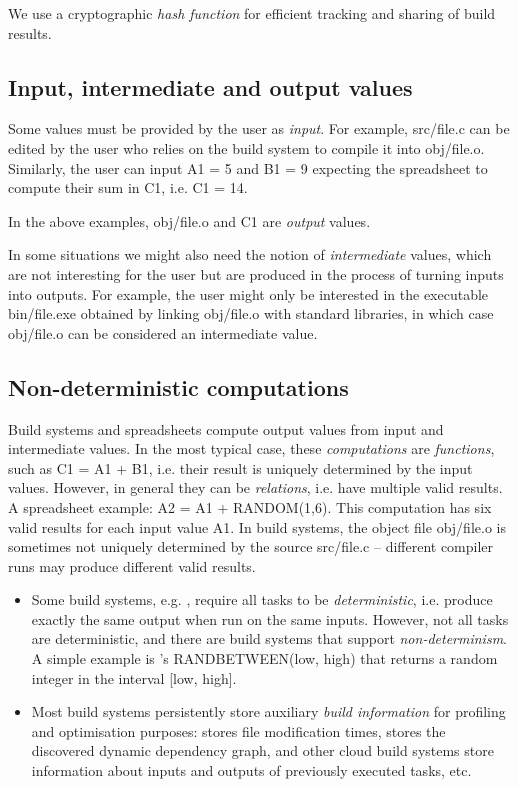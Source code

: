 We use a cryptographic \emph{hash function}  for
efficient tracking and sharing of build results.

\subsection{Input, intermediate and output values}

Some values must be provided by the user as \emph{input}. For example,
\textsf{src/file.c} can be edited by the user who relies on the build system to
compile it into \textsf{obj/file.o}. Similarly, the user can input \textsf{A1 = 5}
and \textsf{B1 = 9} expecting the spreadsheet to compute their sum in \textsf{C1},
i.e. \textsf{C1 = 14}.

In the above examples, \textsf{obj/file.o} and \textsf{C1} are \emph{output} values.

In some situations we might also need the notion of \emph{intermediate} values,
which are not interesting for the user but are produced in the process of turning
inputs into outputs. For example, the user might only be interested in the
executable \textsf{bin/file.exe} obtained by linking \textsf{obj/file.o} with
standard libraries, in which case \textsf{obj/file.o} can be considered an
intermediate value.

\subsection{Non-deterministic computations}

Build systems and spreadsheets compute output values from input and intermediate
values. In the most typical case, these \emph{computations} are \emph{functions},
such as \textsf{C1 = A1 + B1}, i.e. their result is uniquely determined by the
input values. However, in general they can be \emph{relations}, i.e. have
multiple valid results. A spreadsheet example: \textsf{A2 = A1 + RANDOM(1,6)}.
This computation has six valid results for each input value \textsf{A1}. In
build systems, the object file \textsf{obj/file.o} is sometimes not uniquely
determined by the source \textsf{src/file.c} -- different compiler runs may
produce different valid results.


\begin{itemize}

    \item Some build systems, e.g. \Buck, require all tasks to be
    \emph{deterministic}, i.e. produce exactly the same output when run on the
    same inputs. However, not all tasks are deterministic, and there are build
    systems that support \emph{non-determinism}. A simple example is \Excel's
    \textsf{RANDBETWEEN(low, high)} that returns a random integer in the
    interval \textsf{[low, high]}.

    \item Most build systems persistently store auxiliary \emph{build
    information} for profiling and optimisation purposes: \Make stores file
    modification times, \Shake stores the discovered dynamic dependency graph,
    \Bazel and other cloud build systems store information about inputs and
    outputs of previously executed tasks, etc.
\end{itemize}


